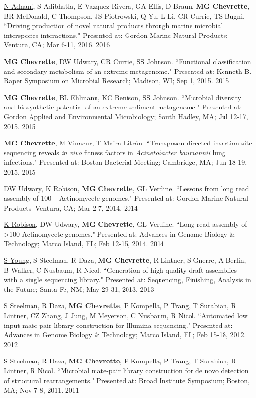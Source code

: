 \begin{cvpubs}
\end{cvpubs} \begin{cvpubs}

\cvpub
{\underline{N Adnani}, S Adibhatla, E Vazquez-Rivera, GA Ellis, D Braun, \textbf{MG Chevrette}, BR McDonald, C Thompson, JS Piotrowski, Q Yu, L Li, CR Currie, TS Bugni. ``Driving production of novel natural products through marine microbial interspecies interactions." Presented at: Gordon Marine Natural Products; Ventura, CA; Mar 6-11, 2016.}
{2016}

\cvpub
{\textbf{\underline{MG Chevrette}}, DW Udwary, CR Currie, SS Johnson. ``Functional classification and secondary metabolism of an extreme metagenome." Presented at: Kenneth B. Raper Symposium on Microbial Research; Madison, WI; Sep 1, 2015.}
{2015}

\cvpub
{\textbf{\underline{MG Chevrette}}, BL Ehlmann, KC Benison, SS Johnson. ``Microbial diversity and biosynthetic potential of an extreme sediment metagenome." Presented at: Gordon Applied and Environmental Microbiology; South Hadley, MA; Jul 12-17, 2015.}
{2015}

\cvpub
{\textbf{\underline{MG Chevrette}}, M Vinacur, T Maira-Litr\'{a}n. ``Transposon-directed insertion site sequencing reveals \textit{in vivo} fitness factors in \textit{Acinetobacter baumannii} lung infections." Presented at: Boston Bacterial Meeting; Cambridge, MA; Jun 18-19, 2015.}
{2015}

\cvpub
{\underline{DW Udwary}, K Robison, \textbf{MG Chevrette}, GL Verdine. ``Lessons from long read assembly of 100+ Actinomycete genomes." Presented at: Gordon Marine Natural Products; Ventura, CA; Mar 2-7, 2014.}
{2014}

\cvpub
{\underline{K Robison}, DW Udwary, \textbf{MG Chevrette}, GL Verdine. ``Long read assembly of >100 Actinomycete genomes." Presented at: Advances in Genome Biology \& Technology; Marco Island, FL; Feb 12-15, 2014.}
{2014}

\cvpub
{\underline{S Young}, S Steelman, R Daza, \textbf{MG Chevrette}, R Lintner, S Gnerre, A Berlin, B Walker, C Nusbaum, R Nicol. ``Generation of high-quality draft assemblies with a single sequencing library." Presented at: Sequencing, Finishing, Analysis in the Future; Santa Fe, NM; May 29-31, 2013.}
{2013}

\cvpub
{\underline{S Steelman}, R Daza, \textbf{MG Chevrette}, P Kompella, P Trang, T Surabian, R Lintner, CZ Zhang, J Jung, M Meyerson, C Nusbaum, R Nicol. ``Automated low input mate-pair library construction for Illumina sequencing." Presented at: Advances in Genome Biology \& Technology; Marco Island, FL; Feb 15-18, 2012.}
{2012}

\cvpub
{S Steelman, R Daza, \underline{\textbf{MG Chevrette}}, P Kompella, P Trang, T Surabian, R Lintner, R Nicol. ``Microbial mate-pair library construction for de novo detection of structural rearrangements." Presented at: Broad Institute Symposium; Boston, MA; Nov 7-8, 2011.}
{2011}

\end{cvpubs}